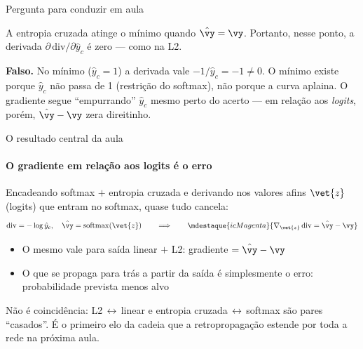 \documentclass[aspectratio=169, 11pt]{beamer}
\begin{document}
\begin{frame}{Pergunta para conduzir em aula}
  \begin{quizbox}
    A entropia cruzada atinge o mínimo quando $\hat{\vy} = \vy$. Portanto,
    nesse ponto, a derivada $\partial\,\mathrm{div} / \partial \hat{y}_c$ é
    zero — como na L2.

    \smallskip
  \end{quizbox}

  \pause

  \begin{respbox}
    \textbf{Falso.} No mínimo ($\hat{y}_c = 1$) a derivada vale
    $-1/\hat{y}_c = -1 \neq 0$. O mínimo existe porque $\hat{y}_c$ não passa
    de 1 (restrição do softmax), não porque a curva aplaina. O gradiente
    segue ``empurrando'' $\hat{y}_c$ mesmo perto do acerto — em relação aos
    \emph{logits}, porém, $\hat{\vy} - \vy$ zera direitinho.
  \end{respbox}
\end{frame}

\begin{frame}{O resultado central da aula}
  \framesubtitle{O gradiente em relação aos logits é o erro}

  Encadeando softmax $+$ entropia cruzada e derivando nos valores afins
  $\vet{z}$ (logits) que entram no softmax, quase tudo cancela:
  \[
    \mathrm{div} = -\log \hat{y}_c, \quad \hat{\vy} = \mathrm{softmax}(\vet{z})
    \qquad\Longrightarrow\qquad
    \mdestaque{icMagenta}{\nabla_{\vet{z}}\, \mathrm{div} = \hat{\vy} - \vy}
  \]

  \begin{itemize}\setlength{\itemsep}{0.2ex}
    \item O mesmo vale para saída linear $+$ L2: gradiente $= \hat{\vy} - \vy$
    \item O que se propaga para trás a partir da saída é simplesmente
          \alert{o erro}: probabilidade prevista menos alvo
  \end{itemize}

  \begin{ideiabox}
    Não é coincidência: L2$\,\leftrightarrow\,$linear e entropia
    cruzada$\,\leftrightarrow\,$softmax são pares ``casados''. É o primeiro
    elo da cadeia que a retropropagação estende por toda a rede na próxima aula.
  \end{ideiabox}
\end{frame}
\end{document}
